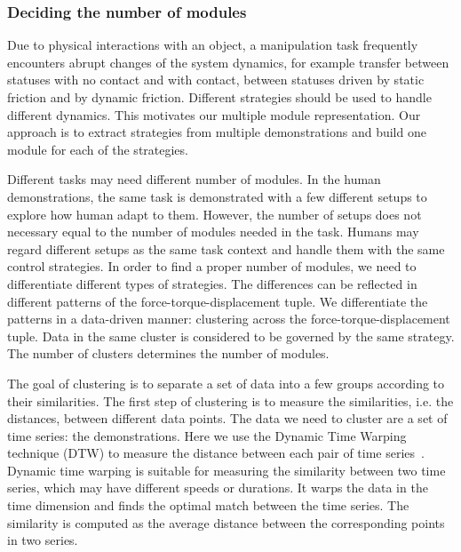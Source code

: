 \subsubsection{Deciding the number of modules}
\label{sec:cluster}

Due to physical interactions with an object, a manipulation task
frequently encounters abrupt changes of the system dynamics, for
example transfer between statuses with no contact and with contact,
between statuses driven by static friction and by
dynamic friction. Different strategies should be used to handle
different dynamics. This motivates our multiple module
representation. Our approach is to extract strategies from multiple
demonstrations and build one module for each of the
strategies. %


Different tasks may need different number of modules. In the human
demonstrations, the same task is demonstrated with a few different
setups to explore how human adapt to them. However, the number of
setups does not necessary equal to the number of modules needed in the
task. Humans may regard different setups as the same task context and
handle them with the same control
strategies. %
In order to find a proper number of modules, we need to differentiate
different types of strategies. The differences can be reflected in
different patterns of the force-torque-displacement tuple. We
differentiate the patterns in a data-driven manner: clustering across
the force-torque-displacement tuple. Data in the same cluster is
considered to be governed by the same strategy. The number of clusters
determines the number of modules.


The goal of clustering is to separate a set of data into a few groups
according to their similarities. The first step of clustering is to
measure the similarities, i.e. the distances, between different data
points. The data we need to cluster are a set of time series: the demonstrations.
Here we
use the Dynamic Time Warping technique (DTW) to measure the distance
between each pair of time series~\citep{berndt1994using}.
Dynamic time warping is suitable for measuring the similarity between
two time series, which may have different speeds or durations. It
warps the data in the time dimension and finds the optimal match
between the time series. The similarity is computed as the average
distance between the corresponding points in two series.

